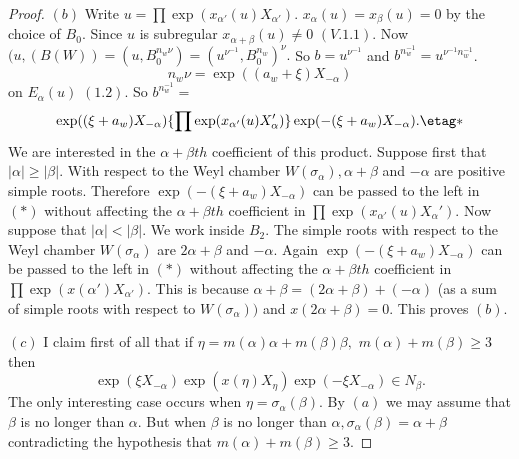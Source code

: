\documentclass{memo-l}
\theoremstyle{definition}
\theoremstyle{remark}
\numberwithin{section}{chapter}
\numberwithin{equation}{chapter}
\begin{document}
\begin{proof}
   $(b)$ Write $u = \prod \exp(x_{{\alpha}'}(u)X_{{\alpha}'})$.
$x_{{\alpha}}(u) = x_{{\beta}}(u) = 0$
by the choice of $B_{0}$.  Since $u$ is subregular
$x_{{\alpha}+{\beta}}(u) \ne 0$ $(V.1.1)$.  Now $(u,(B(W)) =
(u,B_{0}^{n_{w}{\nu}}) = (u^{{\nu}^{-1}},B_{0}^{n_w})^\nu.$ So
$b = u^{{\nu}^{-1}}$ and $b^{n_{w}^{-1}} =
u^{{\nu}^{-1}n_{w}^{-1}}$.  $$n_{w}{\nu} =
\exp((a_{w}+{\xi})X_{-{\alpha}})$$ on $E_{{\alpha}}(u)$ $(1.2)$.  So
$b^{n_{w}^{-1}} =$
$$
\exp(({\xi}+a_{w})X_{-{\alpha}})\{ \prod \exp(x_{{\alpha}'}(u)X_{{\alpha}}')\}
\exp(-({\xi}+a_{w})X_{-{\alpha}}) .   \etag *
$$
We are interested in the ${\alpha}+{\beta}th$ coefficient of this product.
Suppose first that $\vert {\alpha}\vert \ge \vert {\beta}\vert .$ With
respect to the Weyl chamber $W({\sigma}_{{\alpha}}), {\alpha}+{\beta}$ and
$-{\alpha}$ are positive simple roots.  Therefore
$\exp(-({\xi}+a_{w})X_{-{\alpha}})$ can be passed to the left in $(*)$
without affecting the ${\alpha}+{\beta}th$ coefficient in
$\prod \exp(x_{{\alpha}'}(u)X_{{\alpha}}')$.
Now suppose that $\vert {\alpha}\vert < \vert {\beta}\vert .$ We work
inside $B_{2}$.  The simple roots with respect to the Weyl chamber
$W({\sigma}_{{\alpha}})$ are $2{\alpha}+{\beta}$ and $-{\alpha}$.  Again
$\exp(-({\xi}+a_{w})X_{-{\alpha}})$ can be passed to the left in $(*)$
without affecting the ${\alpha}+{\beta}th$ coefficient in
$\prod \exp(x({\alpha}')X_{{\alpha}'})$.
This is because ${\alpha}+{\beta} = (2{\alpha}+{\beta}) + (-{\alpha})$ (as
a sum of simple roots with respect to $W({\sigma}_{{\alpha}}))$ and
$x(2{\alpha}+{\beta}) = 0$.  This proves $(b)$.

   $(c)$ I claim first of all that if
${\eta} = m({\alpha}){\alpha}+m({\beta}){\beta},$ $m({\alpha})+m({\beta}) \ge 3$
then
$$\exp({\xi}X_{-{\alpha}})\exp(x({\eta})X_{{\eta}})\exp(-{\xi}X_{-{\alpha}})
 \in  N_{{\beta}}.$$  The only interesting case occurs when
${\eta} = {\sigma}_{{\alpha}}({\beta})$.  By $(a)$ we may assume that
${\beta}$ is no longer than ${\alpha}$.  But when ${\beta}$ is no longer
than ${\alpha}, {\sigma}_{{\alpha}}({\beta}) = {\alpha}+{\beta}$
contradicting the hypothesis that $m({\alpha})+m({\beta}) \ge 3$.



\end{proof}
\end{document}
